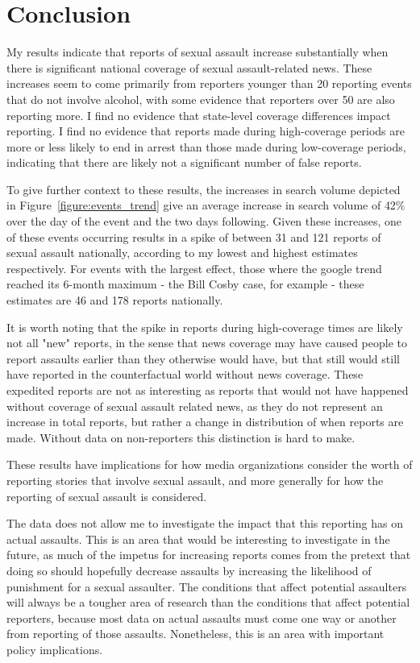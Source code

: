 \documentclass[AER,draftmode]{AEA}
\begin{document}
\section{Conclusion}

My results indicate that reports of sexual assault increase substantially when there is significant national coverage of sexual assault-related news. These increases seem to come primarily from reporters younger than 20 reporting events that do not involve alcohol, with some evidence that reporters over 50 are also reporting more. I find no evidence that state-level coverage differences impact reporting. I find no evidence that reports made during high-coverage periods are more or less likely to end in arrest than those made during low-coverage periods, indicating that there are likely not a significant number of false reports.

To give further context to these results, the increases in search volume depicted in Figure~\ref{figure:events_trend} give an average increase in search volume of 42\% over the day of the event and the two days following. Given these increases, one of these events occurring results in a spike of between 31 and 121 reports of sexual assault nationally, according to my lowest and highest estimates respectively. For events with the largest effect, those where the google trend reached its 6-month maximum - the Bill Cosby case, for example - these estimates are 46 and 178 reports nationally. 

It is worth noting that the spike in reports during high-coverage times are likely not all "new" reports, in the sense that news coverage may have caused people to report assaults earlier than they otherwise would have, but that still would still have reported in the counterfactual world without news coverage. These expedited reports are not as interesting as reports that would not have happened without coverage of sexual assault related news, as they do not represent an increase in total reports, but rather a change in distribution of when reports are made. Without data on non-reporters this distinction is hard to make. 

These results have implications for how media organizations consider the worth of reporting stories that involve sexual assault, and more generally for how the reporting of sexual assault is considered. 

The data does not allow me to investigate the impact that this reporting has on actual assaults. This is an area that would be interesting to investigate in the future, as much of the impetus for increasing reports comes from the pretext that doing so should hopefully decrease assaults by increasing the likelihood of punishment for a sexual assaulter. The conditions that affect potential assaulters will always be a tougher area of research than the conditions that affect potential reporters, because most data on actual assaults must come one way or another from reporting of those assaults. Nonetheless, this is an area with important policy implications.
\end{document}
